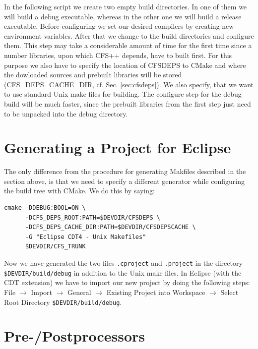 In the following script we create  two empty build directories. In one of them
we will  build a debug executable,  whereas in the  other one we will  build a
release  executable.   Before configuring  we  set  our  desired compilers  by
creating  new  environment  variables.  After  that we  change  to  the  build
directories and configure  them.  This step may take  a considerable amount of
time for  the first time since  a number libraries, upon  which CFS++ depends,
have to built first. For this purpose  we also have to specify the location of
CFSDEPS to CMake  and where the dowloaded sources  and prebuilt libraries will
be  stored  (CFS\_DEPS\_CACHE\_DIR,   cf.  Sec.  \ref{sec:cfsdeps}).  We  also
specify,  that we  want to  use  standard Unix  make files  for building.  The
configure step  for the debug  build will be  much faster, since  the prebuilt
libraries  from  the first  step  just  need to  be  unpacked  into the  debug
directory.



\section{Generating a Project for Eclipse}

The only  difference from the  procedure for generating Makfiles  described in
the section  above, is  that we  need to specify  a different  generator while
configuring the build tree with CMake. We do this by saying:
\begin{verbatim}
cmake -DDEBUG:BOOL=ON \ 
      -DCFS_DEPS_ROOT:PATH=$DEVDIR/CFSDEPS \ 
      -DCFS_DEPS_CACHE_DIR:PATH=$DEVDIR/CFSDEPSCACHE \ 
      -G "Eclipse CDT4 - Unix Makefiles" 
      $DEVDIR/CFS_TRUNK
\end{verbatim}

Now we have generated the two  files {\tt .cproject} and {\tt .project} in the
directory {\tt \$DEVDIR/build/debug}  in addition to the Unix  make files.  In
Eclipse (with  the CDT extension) we have  to import our new  project by doing
the   following  steps:  File   $\rightarrow$  Import   $\rightarrow$  General
$\rightarrow$  Existing  Project  into  Workspace  $\rightarrow$  Select  Root
Directory {\tt \$DEVDIR/build/debug}.

\section{Pre-/Postprocessors}
\label{sec:obtaining_prepostprocs}

